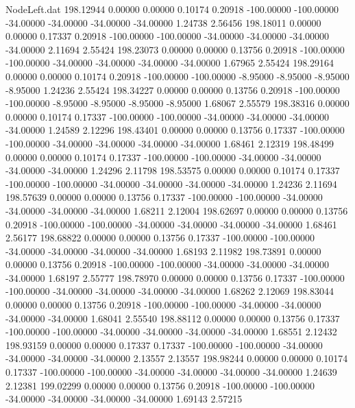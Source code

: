 \begin{filecontents}{NodeLeft.dat}
 198.12944    0.00000    0.00000     0.10174    0.20918 -100.00000 -100.00000  -34.00000  -34.00000  -34.00000  -34.00000    1.24738    2.56456
 198.18011    0.00000    0.00000     0.17337    0.20918 -100.00000 -100.00000  -34.00000  -34.00000  -34.00000  -34.00000    2.11694    2.55424
 198.23073    0.00000    0.00000     0.13756    0.20918 -100.00000 -100.00000  -34.00000  -34.00000  -34.00000  -34.00000    1.67965    2.55424
 198.29164    0.00000    0.00000     0.10174    0.20918 -100.00000 -100.00000   -8.95000   -8.95000   -8.95000   -8.95000    1.24236    2.55424
 198.34227    0.00000    0.00000     0.13756    0.20918 -100.00000 -100.00000   -8.95000   -8.95000   -8.95000   -8.95000    1.68067    2.55579
 198.38316    0.00000    0.00000     0.10174    0.17337 -100.00000 -100.00000  -34.00000  -34.00000  -34.00000  -34.00000    1.24589    2.12296
 198.43401    0.00000    0.00000     0.13756    0.17337 -100.00000 -100.00000  -34.00000  -34.00000  -34.00000  -34.00000    1.68461    2.12319
 198.48499    0.00000    0.00000     0.10174    0.17337 -100.00000 -100.00000  -34.00000  -34.00000  -34.00000  -34.00000    1.24296    2.11798
 198.53575    0.00000    0.00000     0.10174    0.17337 -100.00000 -100.00000  -34.00000  -34.00000  -34.00000  -34.00000    1.24236    2.11694
 198.57639    0.00000    0.00000     0.13756    0.17337 -100.00000 -100.00000  -34.00000  -34.00000  -34.00000  -34.00000    1.68211    2.12004
 198.62697    0.00000    0.00000     0.13756    0.20918 -100.00000 -100.00000  -34.00000  -34.00000  -34.00000  -34.00000    1.68461    2.56177
 198.68822    0.00000    0.00000     0.13756    0.17337 -100.00000 -100.00000  -34.00000  -34.00000  -34.00000  -34.00000    1.68193    2.11982
 198.73891    0.00000    0.00000     0.13756    0.20918 -100.00000 -100.00000  -34.00000  -34.00000  -34.00000  -34.00000    1.68197    2.55777
 198.78970    0.00000    0.00000     0.13756    0.17337 -100.00000 -100.00000  -34.00000  -34.00000  -34.00000  -34.00000    1.68262    2.12069
 198.83044    0.00000    0.00000     0.13756    0.20918 -100.00000 -100.00000  -34.00000  -34.00000  -34.00000  -34.00000    1.68041    2.55540
 198.88112    0.00000    0.00000     0.13756    0.17337 -100.00000 -100.00000  -34.00000  -34.00000  -34.00000  -34.00000    1.68551    2.12432
 198.93159    0.00000    0.00000     0.17337    0.17337 -100.00000 -100.00000  -34.00000  -34.00000  -34.00000  -34.00000    2.13557    2.13557
 198.98244    0.00000    0.00000     0.10174    0.17337 -100.00000 -100.00000  -34.00000  -34.00000  -34.00000  -34.00000    1.24639    2.12381
 199.02299    0.00000    0.00000     0.13756    0.20918 -100.00000 -100.00000  -34.00000  -34.00000  -34.00000  -34.00000    1.69143    2.57215

\end{filecontents}
